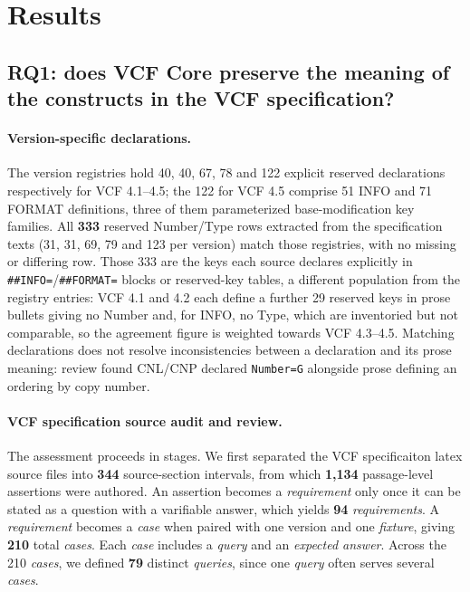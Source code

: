\section{Results}
\label{sec:coverage}

\subsection{RQ1: does VCF Core preserve the meaning of the constructs in the VCF specification?}
\label{sec:evidence}

\paragraph{Version-specific declarations.}
The version registries hold 40, 40, 67, 78 and 122 explicit reserved declarations respectively for VCF 4.1--4.5; the 122 for VCF 4.5 comprise 51 INFO and 71 FORMAT definitions, three of them parameterized base-modification key families.
All \textbf{333} reserved Number/Type rows extracted from the specification texts (31, 31, 69, 79 and 123 per version) match those registries, with no missing or differing row.
Those 333 are the keys each source declares explicitly in \texttt{\#\#INFO=}/\texttt{\#\#FORMAT=} blocks or reserved-key tables, a different population from the registry entries: VCF 4.1 and 4.2 each define a further 29 reserved keys in prose bullets giving no Number and, for INFO, no Type, which are inventoried but not comparable, so the agreement figure is weighted towards VCF 4.3--4.5.
Matching declarations does not resolve inconsistencies between a declaration and its prose meaning: review found CNL/CNP declared \texttt{Number=G} alongside prose defining an ordering by copy number.

\paragraph{VCF specification source audit and review.}
The assessment proceeds in stages.
We first separated the VCF specificaiton latex{} source files into \textbf{344} source-section intervals, from which \textbf{1{,}134} passage-level assertions were authored.
An assertion becomes a \emph{requirement} only once it can be stated as a question with a varifiable answer, which yields \textbf{94} \emph{requirements}.
A \emph{requirement} becomes a \emph{case} when paired with one version and one \emph{fixture}, giving \textbf{210} total \emph{cases}.
Each \emph{case} includes a \emph{query} and an \emph{expected answer}.
Across the 210 \emph{cases}, we defined \textbf{79} distinct \emph{queries}, since one \emph{query} often serves several \emph{cases}.

